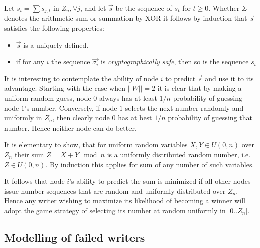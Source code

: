 \documentclass[10pt]{article}
\begin{document}

Let $s_t = \sum s_{j,t}$ in $Z_n, \forall j$, and let $\vec{s}$ be the sequence of $s_t$ for $t \ge 0$. Whether $\Sigma$ denotes the arithmetic sum or summation by XOR it follows by induction that $\vec{s}$ satisfies the following properties:
\begin{itemize}
    \item $\vec{s}$ is a uniquely defined.
    \item if for any $i$ the sequence $\vec{\sigma_i}$ is \emph{cryptographically safe}, then so is the sequence $s_t$ 
\end{itemize}

It is interesting to contemplate the ability of node $i$ to predict $\vec{s}$ and use it to its advantage. Starting with the case when $||W||=2$ it is clear that by making a uniform random guess, node $0$ always has at least $1/n$ probability of guessing node $1$'s number. Conversely, if node $1$ selects the next number randomly and uniformly in $Z_n$, then clearly node $0$ has at best $1/n$ probability of guessing that number. Hence neither node can do better. 

It is elementary to show, that for uniform random variables $X, Y \in U(0,n)$ over $Z_n$ their sum $Z = X + Y \mod n$ is a uniformly distributed random number, i.e. $Z \in U(0,n)$. By induction this applies for sum of any number of such variables.

It follows that node $i$'s ability to predict the sum is minimized if all other nodes issue number sequences that are random and uniformly distributed over $Z_n$. Hence any writer wishing to maximize its likelihood of becoming a winner will adopt the game strategy of selecting its number at random uniformly in [0..$Z_n$].


\subsection{Modelling of failed writers}
\end{document}
